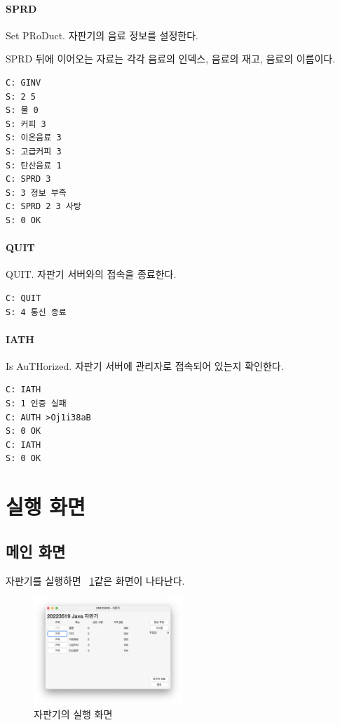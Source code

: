 \documentclass{oblivoir}
\newcommand{\figref}[1]{\figurename~\ref{#1}}
\begin{document}
    \paragraph{SPRD}
    Set PRoDuct.
    자판기의 음료 정보를 설정한다.

    SPRD 뒤에 이어오는 자료는 각각 음료의 인덱스,
    음료의 재고, 음료의 이름이다.

    \begin{verbatim}
C: GINV
S: 2 5
S: 물 0
S: 커피 3
S: 이온음료 3
S: 고급커피 3
S: 탄산음료 1
C: SPRD 3
S: 3 정보 부족
C: SPRD 2 3 사탕
S: 0 OK\end{verbatim}

    \paragraph{QUIT}
    QUIT. 자판기 서버와의 접속을 종료한다.

    \begin{verbatim}
C: QUIT
S: 4 통신 종료\end{verbatim}

    \paragraph{IATH}
    Is AuTHorized.
    자판기 서버에 관리자로 접속되어 있는지 확인한다.

    \begin{verbatim}
C: IATH
S: 1 인증 실패
C: AUTH >Oj1i38aB
S: 0 OK
C: IATH
S: 0 OK\end{verbatim}

    \section{실행 화면}

    \subsection{메인 화면}

    자판기를 실행하면 \figref{fig:vending-machine}\과 같은 화면이 나타난다.
    \begin{figure}[h]
        \centering
        \includegraphics[width=0.5\textwidth]{images/snapshot/vending-machine}
        \caption{자판기의 실행 화면}
        \label{fig:vending-machine}
    \end{figure}
\end{document}
